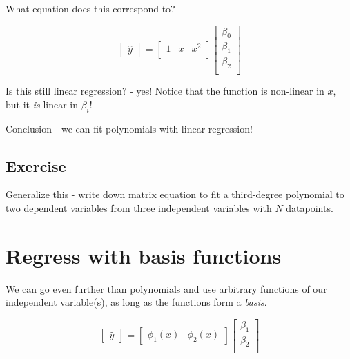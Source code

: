 \documentclass[11pt]{article}
\newcommand\yhat{\hat{y}}
\begin{document}
What equation does this correspond to?

\begin{equation}
    \begin{bmatrix}
        \yhat 
    \end{bmatrix} = 
    \begin{bmatrix}
        1 & x & x^2 \\
    \end{bmatrix}
    \begin{bmatrix}
        \beta_0 \\
        \beta_1 \\
        \beta_2 \\
    \end{bmatrix}
\end{equation}

Is this still linear regression? - yes!
Notice that the function is non-linear in $x$, but it \emph{is} linear
in $\beta_i$!

Conclusion - we can fit polynomials with linear regression!

\subsection{ Exercise }

Generalize this - write down matrix equation to fit a third-degree
polynomial to two dependent variables from three independent variables
with $N$ datapoints.

\section{ Regress with basis functions }

We can go even further than polynomials and use arbitrary functions of
our independent variable(s), as long as the functions form a
\emph{basis}.

\begin{equation}
    \begin{bmatrix}
        \yhat 
    \end{bmatrix} = 
    \begin{bmatrix}
        \phi_1(x) & \phi_2(x) 
    \end{bmatrix}
    \begin{bmatrix}
        \beta_1 \\
        \beta_2 \\
    \end{bmatrix}
\end{equation}
\end{document}
